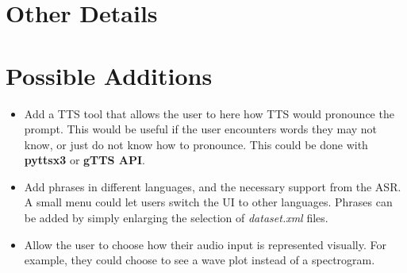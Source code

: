 \documentclass[12pt, letterpaper]{article}
\begin{document}
\section*{Other Details}


\section*{Possible Additions}
\begin{itemize}
\item{Add a TTS tool that allows the user to here how TTS would pronounce the prompt. This would be useful if the user encounters words they may not know, or just do not know how to pronounce. This could be done with \textbf{pyttsx3} or \textbf{gTTS API}.}

\item{Add phrases in different languages, and the necessary support from the ASR. A small menu could let users switch the UI to other languages. Phrases can be added by simply enlarging the selection of \textit{dataset.xml} files.}

\item{Allow the user to choose how their audio input is represented visually. For example, they could choose to see a wave plot instead of a spectrogram.}
\end{itemize}
\end{document}
